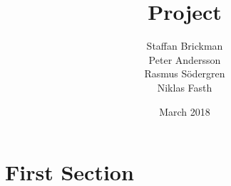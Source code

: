 \documentclass{article}
\title{Project}
\author{Staffan Brickman\\
Peter Andersson\\
Rasmus Södergren\\
Niklas Fasth}
\date{March 2018}
\begin{document}
\maketitle
\section{First Section}
\end{document}

